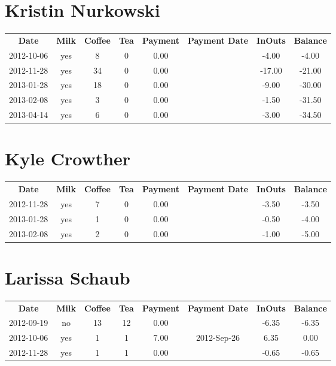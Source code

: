 \section{Kristin Nurkowski}

\begin{center}
\begin{tabular}{cccccccc}
\textbf{Date} & \textbf{Milk} & \textbf{Coffee} & \textbf{Tea} & \textbf{Payment} & \textbf{Payment Date} & \textbf{InOuts} & \textbf{Balance} \\
2012-10-06 & yes &  8 & 0 & 0.00 &  &  -4.00 &  -4.00\\ 
2012-11-28 & yes & 34 & 0 & 0.00 &  & -17.00 & -21.00\\ 
2013-01-28 & yes & 18 & 0 & 0.00 &  &  -9.00 & -30.00\\ 
2013-02-08 & yes &  3 & 0 & 0.00 &  &  -1.50 & -31.50\\ 
2013-04-14 & yes &  6 & 0 & 0.00 &  &  -3.00 & -34.50
\end{tabular}
\end{center}

\section{Kyle Crowther}

\begin{center}
\begin{tabular}{cccccccc}
\textbf{Date} & \textbf{Milk} & \textbf{Coffee} & \textbf{Tea} & \textbf{Payment} & \textbf{Payment Date} & \textbf{InOuts} & \textbf{Balance} \\
2012-11-28 & yes & 7 & 0 & 0.00 &  & -3.50 & -3.50\\ 
2013-01-28 & yes & 1 & 0 & 0.00 &  & -0.50 & -4.00\\ 
2013-02-08 & yes & 2 & 0 & 0.00 &  & -1.00 & -5.00
\end{tabular}
\end{center}

\section{Larissa Schaub}

\begin{center}
\begin{tabular}{cccccccc}
\textbf{Date} & \textbf{Milk} & \textbf{Coffee} & \textbf{Tea} & \textbf{Payment} & \textbf{Payment Date} & \textbf{InOuts} & \textbf{Balance} \\
2012-09-19 & no & 13 & 12 & 0.00 &  & -6.35 & -6.35\\ 
2012-10-06 & yes &  1 &  1 & 7.00 & 2012-Sep-26 &  6.35 &  0.00\\ 
2012-11-28 & yes &  1 &  1 & 0.00 &  & -0.65 & -0.65
\end{tabular}
\end{center}

